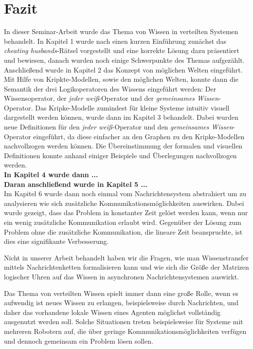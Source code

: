 \section{Fazit}
\label{Zusammenfassung}
In dieser Seminar-Arbeit wurde das Thema von Wissen in verteilten Systemen behandelt.
In Kapitel 1 wurde nach einen kurzen Einführung zunächst das \textit{cheating husbands}-Rätsel vorgestellt und eine korrekte Lösung dazu präsentiert und bewiesen, danach wurden noch einige Schwerpunkte des Themas aufgezählt.
Anschließend wurde in Kapitel 2 das Konzept von möglichen Welten eingeführt. Mit Hilfe von Kripkte-Modellen, sowie den möglichen Welten, konnte dann die Semantik der drei Logikoperatoren des Wissens eingeführt werden: Der Wissensoperator, der \textit{jeder weiß}-Operator und der \textit{gemeinsames Wissen}-Operator.
Das Kripke-Modelle zumindest für kleine Systeme intuitiv visuell dargestellt werden können, wurde dann im Kapitel 3 behandelt. Dabei wurden neue Definitionen für den \textit{jeder weiß}-Operator und den \textit{gemeinsames Wissen}-Operator eingeführt, da diese einfacher an den Graphen zu den Kripke-Modellen nachvollzogen werden können. Die Übereinstimmung der formalen und visuellen Definitionen konnte anhand einiger Beispiele und Überlegungen nachvollzogen werden.\\
\textbf{In Kapitel 4 wurde dann ...}\\
\textbf{Daran anschließend wurde in Kapitel 5 ...} \\
Im Kapitel 6 wurde dann noch einmal vom Nachrichtensystem abstrahiert um zu analysieren wie sich zusätzliche Kommunikationsmöglichkeiten auswirken.
Dabei wurde gezeigt, dass das Problem in konstanter Zeit gelöst werden kann, wenn nur ein wenig zusätzliche Kommunikation erlaubt wird. Gegenüber der Lösung zum Problem ohne die zusätzliche Kommunikation, die lineare Zeit beanspruchte, ist dies eine signifikante Verbesserung.\medskip

Nicht in unserer Arbeit behandelt haben wir die Fragen, wie man Wissenstransfer mittels Nachrichtenketten formalisieren kann und wie sich die Größe der Matrizen logischer Uhren auf das Wissen in asynchronen Nachrichtensystemen auswirkt.\medskip

Das Thema von verteilten Wissen spielt immer dann eine große Rolle, wenn es aufwendig ist neues Wissen zu erlangen, beispielsweise durch Nachrichten, und daher das vorhandene lokale Wissen eines Agenten möglichst vollständig ausgenutzt werden soll.
Solche Situationen treten beispielsweise für Systeme mit mehreren Robotern auf, die über geringe Kommunikationsmöglichkeiten verfügen und dennoch gemeinsam ein Problem lösen sollen.
